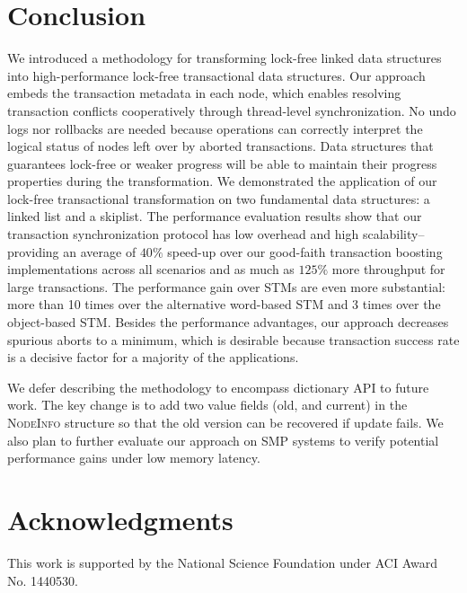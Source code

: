 \documentclass{sig-alternate-05-2015}
\begin{document}
\section{Conclusion}
\label{sec:conclusion}
We introduced a methodology for transforming lock-free linked data structures into high-performance lock-free transactional data structures. 
Our approach embeds the transaction metadata in each node, which enables resolving transaction conflicts cooperatively through thread-level synchronization.
No undo logs nor rollbacks are needed because operations can correctly interpret the logical status of nodes left over by aborted transactions.
Data structures that guarantees lock-free or weaker progress will be able to maintain their progress properties during the transformation.
We demonstrated the application of our lock-free transactional transformation on two fundamental data structures: a linked list and a skiplist.  
The performance evaluation results show that our transaction synchronization protocol has low overhead and high scalability--providing an average of $40\%$ speed-up over our good-faith transaction boosting implementations across all scenarios and as much as $125\%$ more throughput for large transactions.
The performance gain over STMs are even more substantial: more than 10 times over the alternative word-based STM and 3 times over the object-based STM.
Besides the performance advantages, our approach decreases spurious aborts to a minimum, which is desirable because transaction success rate is a decisive factor for a majority of the applications.

We defer describing the methodology to encompass dictionary API to future work.
The key change is to add two value fields (old, and current) in the \textsc{NodeInfo} structure so that the old version can be recovered if update fails.
We also plan to further evaluate our approach on SMP systems to verify potential performance gains under low memory latency.


\section{Acknowledgments}
This work is supported by the National Science Foundation under ACI Award No. 1440530.



\end{document}
